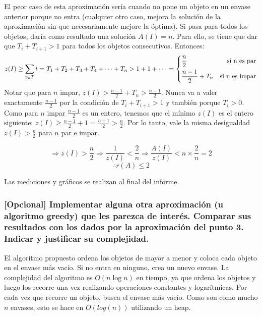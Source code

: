 \documentclass[11pt]{article}
\begin{document}
El peor caso de esta aproximación sería cuando no pone un objeto en un
envase anterior porque no entra (cualquier otro caso, mejora la solución
de la aproximación sin que necesariamente mejore la óptima). Si pasa
para todos los objetos, daría como resultado una solución \(A(I) = n\).
Para ello, se tiene que dar que \(T_i + T_{i+1} > 1\) para todos los
objetos consecutivos. Entonces: \[
z(I) \geq \sum\limits_{t \in T} t = T_1 + T_2 + T_3 + T_4 + \dotsb + T_n > 1 + 1 + \dotsb \\
= \left\{
    \begin{aligned}
        &\frac{n}{2} &\text{si n es par} \\
        &\frac{n-1}{2} + T_n &\text{si n es impar}
    \end{aligned}
\right.
\] Notar que para \(n\) impar,
\(z(I) > \frac{n-1}{2} + T_n > \frac{n-1}{2}\). Nunca va a valer
exactamente \(\frac{n-1}{2}\) por la condición de \(T_i + T_{i+1} > 1\)
y también porque \(T_i > 0\). Como para \(n\) impar \(\frac{n-1}{2}\) es
un entero, tenemos que el mínimo \(z(I)\) es el entero siguiente:
\(z(I) \geq \frac{n-1}{2} + 1 = \frac{n+1}{2} > \frac{n}{2}\). Por lo
tanto, vale la misma desigualdad \(z(I) > \frac{n}{2}\) para \(n\) par e
impar.

\[
\Rightarrow z(I) > \frac{n}{2} \Rightarrow \frac{1}{z(I)} < \frac{2}{n} \Rightarrow \frac{A(I)}{z(I)} < n \times \frac{2}{n} = 2
\] \[
\therefore r(A) \leq 2
\]

Las mediciones y gráficos se realizan al final del informe.

    \hypertarget{opcional-implementar-alguna-otra-aproximaciuxf3n-u-algoritmo-greedy-que-les-parezca-de-interuxe9s.-comparar-sus-resultados-con-los-dados-por-la-aproximaciuxf3n-del-punto-3.-indicar-y-justificar-su-complejidad.}{%
\subsubsection{{[}Opcional{]} Implementar alguna otra aproximación (u
algoritmo greedy) que les parezca de interés. Comparar sus resultados
con los dados por la aproximación del punto 3. Indicar y justificar su
complejidad.}\label{opcional-implementar-alguna-otra-aproximaciuxf3n-u-algoritmo-greedy-que-les-parezca-de-interuxe9s.-comparar-sus-resultados-con-los-dados-por-la-aproximaciuxf3n-del-punto-3.-indicar-y-justificar-su-complejidad.}}

    El algoritmo propuesto ordena los objetos de mayor a menor y coloca cada
objeto en el envase más vacío. Si no entra en ninguno, crea un nuevo
envase. La complejidad del algoritmo es \(O(n \log n)\) en tiempo, ya
que ordena los objetos y luego los recorre una vez realizando
operaciones constantes y logarítmicas. Por cada vez que recorre un
objeto, busca el envase más vacío. Como son como mucho \(n\) envases,
esto se hace en \(O(log(n))\) utilizando un heap.
\end{document}
